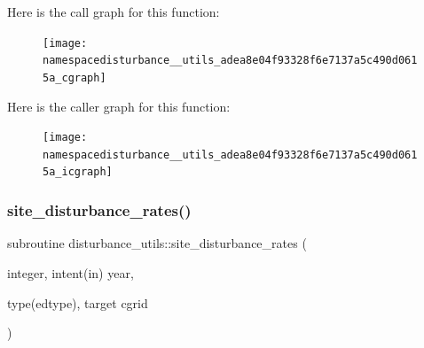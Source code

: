 Here is the call graph for this function\+:
\nopagebreak
\begin{figure}[H]
\begin{center}
\leavevmode
\texttt{[image: namespacedisturbance\_\_utils\_adea8e04f93328f6e7137a5c490d0615a\_cgraph]}
\end{center}
\end{figure}
Here is the caller graph for this function\+:
\nopagebreak
\begin{figure}[H]
\begin{center}
\leavevmode
\texttt{[image: namespacedisturbance\_\_utils\_adea8e04f93328f6e7137a5c490d0615a\_icgraph]}
\end{center}
\end{figure}
\mbox{\label{namespacedisturbance__utils_a9045765ed99ce8acf000838b2c532deb}} 
\subsubsection{\texorpdfstring{site\+\_\+disturbance\+\_\+rates()}{site\_disturbance\_rates()}}
{\footnotesize\ttfamily subroutine disturbance\+\_\+utils\+::site\+\_\+disturbance\+\_\+rates (\begin{DoxyParamCaption}\item[{integer, intent(in)}]{year,  }\item[{type(edtype), target}]{cgrid }\end{DoxyParamCaption})}

